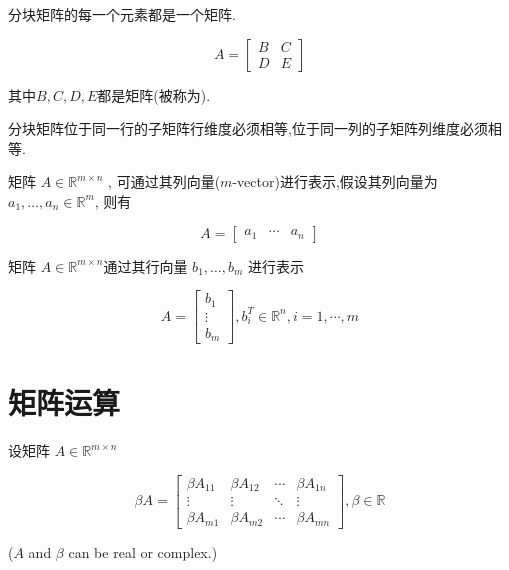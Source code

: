 \begin{definition}[分块矩阵]
    分块矩阵的每一个元素都是一个矩阵.

    $$ A=\left[\begin{array}{ll}B & C \\ D & E\end{array}\right] $$

    其中$B,C,D,E$都是矩阵(被称为).
\end{definition}

分块矩阵位于同一行的子矩阵行维度必须相等,位于同一列的子矩阵列维度必须相等.

\begin{definition}[矩阵的列向量表示]
    矩阵 $ A \in \mathbb{R}^{m \times n} $ , 可通过其列向量($m$-vector)进行表示,假设其列向量为 $ a_{1}, \ldots, a_{n} \in \mathbb{R}^{m} $, 则有

    $$ A=\left[\begin{array}{lll}a_{1} & \cdots & a_{n}\end{array}\right] $$
\end{definition}

\begin{definition}[矩阵的行向量表示]
    矩阵 $ A \in \mathbb{R}^{m \times n} $通过其行向量 $ b_{1}, \ldots, b_{m} $ 进行表示

    $$ A=\left[\begin{array}{c}b_{1} \\ \vdots \\ b_{m}\end{array}\right], b_{i}^{T} \in \mathbb{R}^{n}, i=1, \cdots, m $$
\end{definition}

\section{矩阵运算}

\begin{definition}[矩阵数乘]
    设矩阵 $ A \in \mathbb{R}^{m \times n} $

    $$ \beta A=\left[\begin{array}{cccc}\beta A_{11} & \beta A_{12} & \cdots & \beta A_{1 n} \\ \vdots & \vdots & \ddots & \vdots \\ \beta A_{m 1} & \beta A_{m 2} & \cdots & \beta A_{m n}\end{array}\right], \beta \in \mathbb{R} $$

    ($ A $ and $ \beta $ can be real or complex.)
\end{definition}

